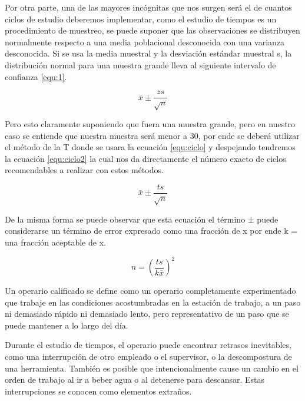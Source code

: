     
    
    Por otra parte, una de las mayores incógnitas que nos surgen será el de cuantos ciclos de estudio deberemos implementar, como el estudio de tiempos es un procedimiento de muestreo, se puede suponer que las observaciones se distribuyen normalmente respecto a una media poblacional desconocida con una varianza desconocida. Si se usa la media muestral y la desviación estándar muestral s, la distribución normal para una muestra grande lleva al siguiente intervalo de confianza \ref{equ:1}. \cite{niebel1980ingenieria}
    
    
    \begin{equation}
        \label{equ:1}
       \bar{x} {\pm} {\frac{zs}{\sqrt{n}}}
    \end{equation}
    
    Pero esto claramente suponiendo que fuera una muestra grande, pero en nuestro caso se entiende que nuestra muestra será menor a 30, por ende se deberá utilizar el método de la T donde se usara la ecuación \ref{equ:ciclo} y despejando tendremos la ecuación \ref{equ:ciclo2} la cual nos da directamente el número exacto de ciclos recomendables a realizar con estos métodos. \cite{niebel1980ingenieria}
    
    
    \begin{equation}
        \label{equ:ciclo}
        \bar{x} {\pm} {\frac{ts}{\sqrt{n}}}
    \end{equation}
    
    De la misma forma se puede observar que esta ecuación el término ± puede considerarse un término de error expresado como una fracción de x por ende k = una fracción aceptable de  x.\cite{niebel1980ingenieria}
    
    
    
    \begin{equation}
        \label{equ:ciclo2}
       n= ({\frac{ts}{k\bar{x}}})^2
    \end{equation}
    
    
    Un operario calificado se define como un operario completamente experimentado que trabaje en las condiciones acostumbradas en la estación de trabajo, a un paso ni demasiado rápido ni demasiado lento, pero representativo de un paso que se puede mantener a lo largo del día.\cite{niebel1980ingenieria}
    
    
    
    Durante el estudio de tiempos, el operario puede encontrar retrasos inevitables, como una interrupción de otro empleado o el supervisor, o la descompostura de una herramienta. También es posible que intencionalmente cause un cambio en el orden de trabajo al ir a beber agua o al detenerse para descansar. Estas interrupciones se conocen como elementos extraños.\cite{niebel1980ingenieria}
    
